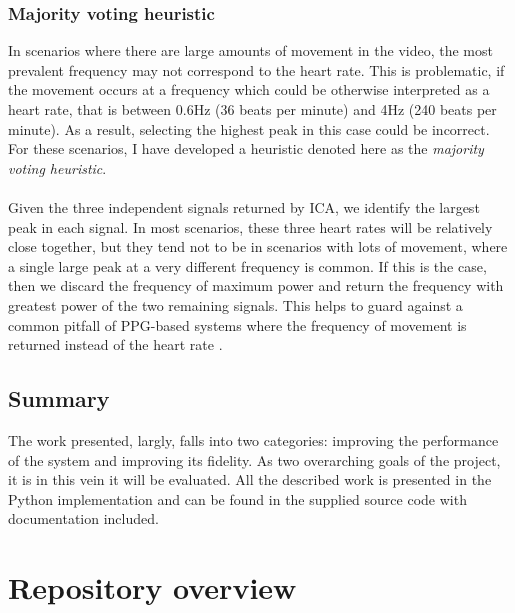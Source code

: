 \subsubsection{Majority voting heuristic}
In scenarios where there are large amounts of movement in the video, the most prevalent frequency may not correspond to the heart rate. This is problematic, if the movement occurs at a frequency 
which could be otherwise interpreted as a heart rate, that is between 0.6Hz (36 beats per minute) and 4Hz (240 beats per minute). As a result, selecting the highest peak in this case could be 
incorrect. For these scenarios, I have developed a heuristic denoted here as the \textit{majority voting heuristic}.
\\\\
Given the three independent signals returned by ICA, we identify the largest peak in each signal. In most scenarios, these three heart rates will be relatively close together, but they tend not to be 
in scenarios with lots of movement, where a single large peak at a very different frequency is common. 
If this is the case, then we discard the frequency of maximum power and return the frequency with greatest power of the two remaining signals.
This helps to guard against a common pitfall of PPG-based systems where the frequency of movement is returned instead of the heart rate \cite{souza2019heart}.
 

\subsection{Summary}
The work presented, largly, falls into two categories: improving the performance of the system and improving its fidelity. As two overarching goals
of the project, it is in this vein it will be evaluated.
All the described work is presented in the Python implementation and can be found in the supplied source code with documentation included.


\section{Repository overview}
